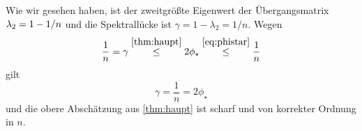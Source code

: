 \documentclass[ngerman,a4paper,11pt]{scrartcl}
\newcommand{\RR}{\mathbb{R}}
\DeclarePairedDelimiter{\sprod}{\langle}{\rangle}	%
\DeclarePairedDelimiter{\abs}{\lvert}{\rvert}		%
\begin{document}
\begin{exmp}
\begin{dproof}
 \end{dproof}
 Wie wir gesehen haben, ist der zweitgrößte Eigenwert der Übergangsmatrix
 $\lambda_2=\nobreak 1-\nobreak 1/n$ und die Spektrallücke ist $\gamma=1-\lambda_2=1/n$. Wegen
 \begin{equation*}
  \frac{1}{n}=\gamma\overset{\ref{thm:haupt}}{\leq} 2\phi_\star\overset{\eqref{eq:phistar}}{\leq}\frac{1}{n} 
 \end{equation*}
 gilt 
 \begin{equation*}
  \gamma=\frac{1}{n}=2\phi_\star 
 \end{equation*}
 und die obere Abschätzung aus \cref{thm:haupt} ist scharf und von korrekter
 Ordnung in $n$.
\end{exmp}

\printbibliography
\end{document}
